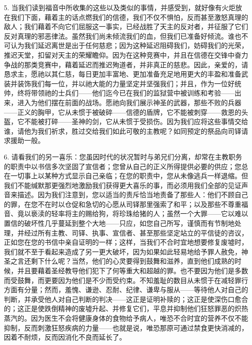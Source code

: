 5. 当我们读到福音中所收集的这些以及类似的事情，并感受到，就好像有火炬放在我们下面，藉着主的话点燃我们的信德，我们不仅不惧怕，反而甚至激怒真理的敌人；我们藉着不向它们屈服这一事实，已经战胜了天主的反对者，并征服了它们反对真理的邪恶律法。虽然我们尚未倾流我们的血，但我们已准备好倾流。谁也不可认为我们延迟离世是出于任何慈悲；因为这种延迟阻碍我们，妨碍我们的光荣，推迟天堂，扣留对天主的荣耀瞻仰。因为在这种竞赛中，并且在信德在交锋中奋力争战的那类竞赛中，藉着延迟而推迟殉道者，并非真正的慈悲。因此，亲爱的，请恳求主，愿祂以其仁慈，每日更加丰富地、更加准备充足地用更大的丰盈和准备武装并装饰我们每一位，并以祂大能的力量坚定并坚强我们；并且，作为一位好统帅，终将带领祂的士兵们——他们迄今已在我们的监狱营中被训练和考验——出来，进入为他们摆在前面的战场。愿祂向我们展示神圣的武器，那些不败的兵器——正义的胸甲，它从未惯于被破碎——信德的盾牌，它不能被刺穿——救恩的头盔，它不能被打碎——圣神的剑，它从未惯于受损伤。因为我们应将这些事情交给谁，请他为我们祈求，胜过交给我们如此可敬的主教呢？如同预定的祭品向司铎请求援助一般。\par

6. 请看我们的另一喜乐：您虽因时代的状况暂时与弟兄们分离，却常在主教职务的职责中以书信多次坚固了宣信者；您曾从自己的正义所得提供必要的供应；您总在一切事上以某种方式显示自己亲临；在您的职责中，您从未像逃兵一样退缩。但我们不能缄默那更强烈地激励我们获得更大喜乐的事，而必须用我们全部的见证声音来描述。因为我们注意到，您以适当的责斥恰当地责备了那些人：他们不顾自己的罪，在您不在时以仓促和急切的心愿从司铎那里强索了和平；以及那些不尊重福音、竟以亵渎的轻率将主的赐给狗，将珍珠给猪的人；虽然一个大罪——它以难以置信的破坏性几乎蔓延到整个大地——只应，如您自己所写，谨慎而有节制地处理，并经过所有主教、司铎、执事、宣信者、甚至那些坚定站立的平信徒的咨议，正如您在您的书信中亲自证明的一样；这样，当我们不合时宜地想要修复废墟时，我们就不至于看起来造成了另一更大破坏，因为如果如此轻易地给予罪人赦免，神圣之言还剩下什么呢？当然，他们的心灵要得到鼓舞和滋养，直到他们成熟的时候，并且要藉着圣经教导他们犯下了何等重大和超越的罪。也不要因为他们是多数而受鼓舞，而更要因为他们是不少而受约束。不知羞耻的数目从未惯于在减轻罪行方面有分量；然而，羞愧、谦逊、忍耐、纪律、谦卑与服从——等待他人对自己的判断，并承受他人对自己判断的判决——这正是证明补赎的；这正是使深伤口愈合的；这正是使跌倒精神的废墟升起、并修复它们，平息并抑制他们狂怒罪恶的炽热蒸汽的。因为医生不会将健康身体的食物给予病人，唯恐不合时宜的营养不仅不能抑制，反而刺激狂怒疾病的力量——也就是说，唯恐那原可通过禁食更快消减的，因着不耐烦，反而因消化不良而延长了。\par

